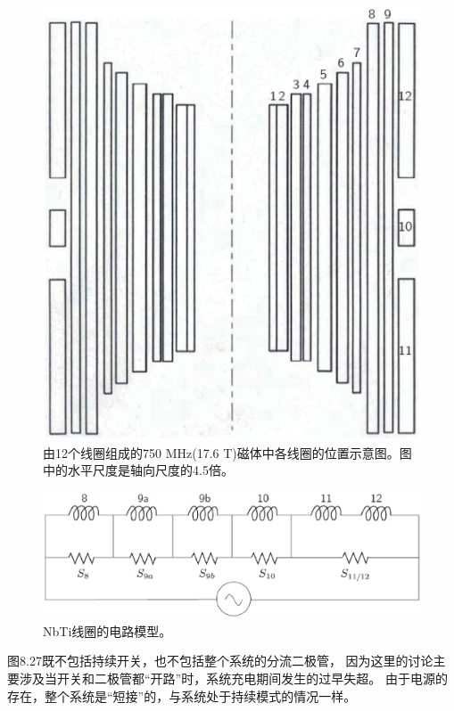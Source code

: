 \begin{figure}
	\centering
	\includegraphics[scale=0.6]{chpt8/figs/fig8.26.eps}
	\caption{由12个线圈组成的750 MHz(17.6 T)磁体中各线圈的位置示意图。图中的水平尺度是轴向尺度的4.5倍。 }
\end{figure}

\begin{figure}
	\centering
	\includegraphics[scale=0.6]{chpt8/figs/fig8.27.eps}
	\caption{NbTi线圈的电路模型。}
\end{figure}

图8.27既不包括持续开关，也不包括整个系统的分流二极管，
因为这里的讨论主要涉及当开关和二极管都“开路”时，系统充电期间发生的过早失超。
由于电源的存在，整个系统是“短接”的，与系统处于持续模式的情况一样。

